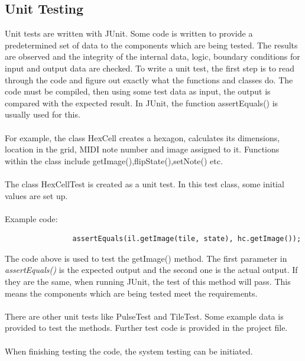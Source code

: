 \documentclass[10pt,a4paper]{article}
\begin{document}
\subsection{Unit Testing}
Unit tests are written with JUnit. Some code is written to provide a predetermined set of data to the components which are being tested. The results are observed and the integrity of the internal data, logic, boundary conditions for input and output data \cite{SEP} are checked. To write a unit test, the first step is to read through the code and figure out exactly what the functions and classes do. The code must be compiled, then using some test data as input, the output is compared with the expected result. In JUnit, the function assertEquals() is usually used for this.\\
\\
For example, the class HexCell creates a hexagon, calculates its dimensions, location in the grid, MIDI note number and image assigned to it. Functions within the class include getImage(),flipState(),setNote() etc.\\
\\
The class HexCellTest is created as a unit test. In this test class, some initial values are set up.\\
\\
Example code: 
\begin{verbatim}
                assertEquals(il.getImage(tile, state), hc.getImage());
\end{verbatim}
 
\noindent
The code above is used to test the getImage() method. The first parameter in \textit{assertEquals()} is the expected output and the second one is the actual output. If they are the same, when running JUnit, the test of this method will pass. This means the components which are being tested meet the requirements.\\
\\
There are other unit tests like PulseTest and TileTest. Some example data is provided to test the methods. Further test code is provided in the project file.\\
\\
When finishing testing the code, the system testing can be initiated. 
\end{document}
